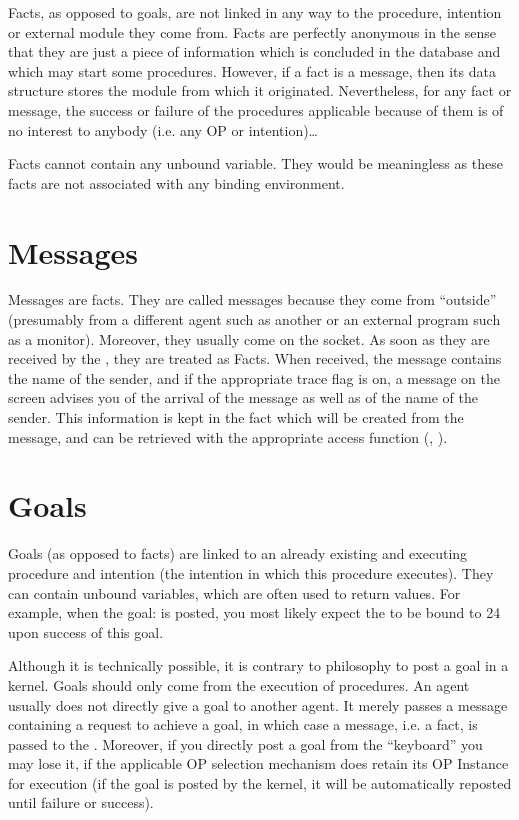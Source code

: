 Facts, as opposed to goals, are not linked in any way to the procedure,
intention or external module they come from. Facts are perfectly anonymous in
the sense that they are just a piece of information which is concluded in the
database and which may start some procedures. However, if a fact is a message,
then its data structure stores the module from which it originated.
Nevertheless, for any fact or message, the success or failure of the procedures
applicable because of them is of no interest to anybody (i.e. any
OP or intention)\dots{}

Facts cannot contain any unbound variable. They would be meaningless as
these facts are not associated with any binding environment.

\section{Messages}

Messages are facts. They are called messages because they come from ``outside''
(presumably from a different agent such as another \CPK{} or an external
program such as a monitor). Moreover, they usually come on the \MP{} socket. As
soon as they are received by the \CPK{}, they are treated as Facts. When
received, the message contains the name of the sender, and if the appropriate
trace flag is on, a message on the screen advises you of the arrival of the
message as well as of the name of the sender. This information is kept in the
fact which will be created from the message, and can be retrieved with the
appropriate access function (, ).

\section{Goals}

Goals (as opposed to facts) are linked to an already existing and executing
procedure and intention (the intention in which this procedure executes).  They
can contain unbound variables, which are often used to return values.  For
example, when the goal:  is posted, you most likely
expect the  to be bound to 24 upon success of this goal.

Although it is technically possible, it is contrary to \OPRS{} philosophy to
post a goal in a kernel. Goals should only come from the execution of
procedures. An agent usually does not directly give a goal to another agent. It
merely passes a message containing a request to achieve a goal, in which case a
message, i.e. a fact, is passed to the \CPK{}.  Moreover, if you directly post
a goal from the ``keyboard'' you may lose it, if the applicable OP selection
mechanism does retain its OP Instance for execution (if the goal is posted by
the kernel, it will be automatically reposted until failure or success).


